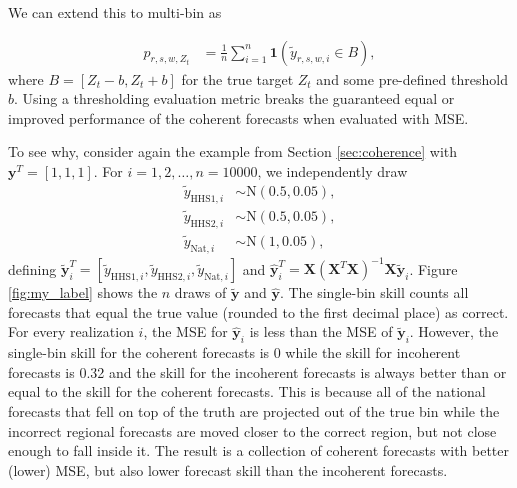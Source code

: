\documentclass{umassthesis}          %
\begin{document}
We can extend this to multi-bin as 

\begin{align}
p_{r,s,w,Z_t} &= \frac{1}{n} \sum_{i=1}^n \bm{1}(\tilde{y}_{r,s,w,i} \in B),
\end{align}
\noindent where $B = [Z_t - b, Z_t + b]$ for the true target $Z_t$ and some pre-defined threshold $b$. Using a thresholding evaluation metric breaks the guaranteed equal or improved performance of the coherent forecasts when evaluated with MSE.




To see why, consider again the example from Section \ref{sec:coherence} with $\bm{y}^T = [1,1,1]$. For $i=1,2,\ldots,n=10000$, we independently draw
\begin{align}
\tilde{y}_{\text{HHS1},i} &\sim \text{N}(0.5, 0.05),\\
\tilde{y}_{\text{HHS2},i} &\sim \text{N}(0.5, 0.05),\\
\tilde{y}_{\text{Nat},i} &\sim \text{N}(1, 0.05),
\end{align}
\noindent defining $\bm{\tilde{y}}_i^T = [\tilde{y}_{\text{HHS1},i}, \tilde{y}_{\text{HHS2},i}, \tilde{y}_{\text{Nat},i}]$ and $\bm{\hat{y}}_i^T = \bm{X}(\bm{X}^T\bm{X})^{-1}\bm{X}\bm{\tilde{y}}_i$. Figure \ref{fig:my_label} shows the $n$ draws of $\bm{\tilde{y}}$ and $\bm{\hat{y}}$. The single-bin skill counts all forecasts that equal the true value (rounded to the first decimal place) as correct. For every realization $i$, the MSE for $\bm{\hat{y}}_i$ is less than the MSE of $\bm{\tilde{y}}_i$. However, the single-bin skill for the coherent forecasts is 0 while the skill for incoherent forecasts is 0.32 and the skill for the incoherent forecasts is always better than or equal to the skill for the coherent forecasts. This is because all of the national forecasts that fell on top of the truth are projected out of the true bin while the incorrect regional forecasts are moved closer to the correct region, but not close enough to fall inside it. The result is a collection of coherent forecasts with better (lower) MSE, but also lower forecast skill than the incoherent forecasts.
\end{document}
